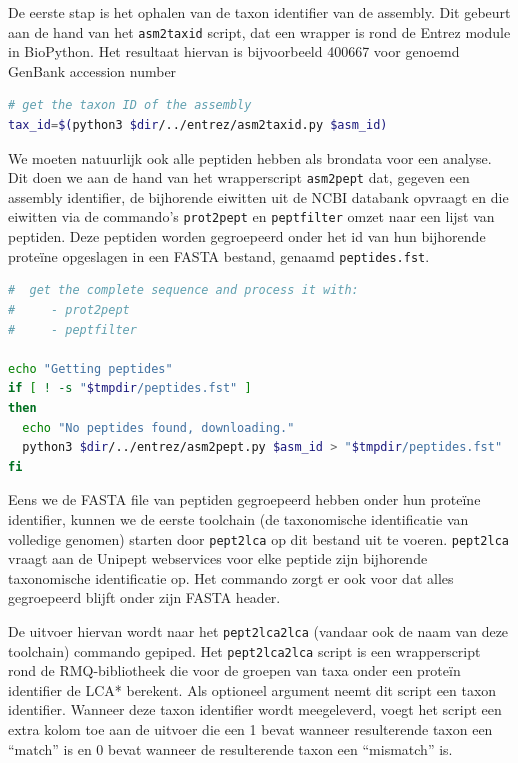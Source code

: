 De eerste stap is het ophalen van de taxon identifier van de assembly. Dit 
gebeurt aan de hand van het \texttt{asm2taxid} script, dat een wrapper is rond 
de Entrez module in BioPython. Het resultaat hiervan is bijvoorbeeld 400667 
voor genoemd GenBank accession number 

\begin{lstlisting}[language=Bash,firstnumber=34]
# get the taxon ID of the assembly
tax_id=$(python3 $dir/../entrez/asm2taxid.py $asm_id)
\end{lstlisting}

We moeten natuurlijk ook alle peptiden hebben als brondata voor een analyse. Dit
doen we aan de hand van het wrapperscript \texttt{asm2pept} dat, gegeven een
assembly identifier, de bijhorende eiwitten uit de NCBI databank opvraagt en
die eiwitten via de commando's \texttt{prot2pept} en \texttt{peptfilter} omzet
naar een lijst van peptiden. Deze peptiden worden gegroepeerd onder het id van
hun bijhorende proteïne opgeslagen in een FASTA bestand, genaamd
\texttt{peptides.fst}.

\begin{lstlisting}[language=Bash,firstnumber=36]
#  get the complete sequence and process it with:
#     - prot2pept
#     - peptfilter

echo "Getting peptides"
if [ ! -s "$tmpdir/peptides.fst" ]
then
  echo "No peptides found, downloading."
  python3 $dir/../entrez/asm2pept.py $asm_id > "$tmpdir/peptides.fst"
fi
\end{lstlisting}

Eens we de FASTA file van peptiden gegroepeerd hebben onder hun proteïne
identifier, kunnen we de eerste toolchain (de taxonomische identificatie
van volledige genomen) starten door \texttt{pept2lca} op dit bestand uit te
voeren. \texttt{pept2lca} vraagt aan de Unipept webservices voor elke peptide
zijn bijhorende taxonomische identificatie op. Het commando zorgt er ook voor
dat alles gegroepeerd blijft onder zijn FASTA header.

De uitvoer hiervan wordt naar het \texttt{pept2lca2lca} (vandaar ook de naam van
deze toolchain) commando gepiped. Het \texttt{pept2lca2lca} script is een
wrapperscript rond de RMQ-bibliotheek die voor de groepen van taxa onder een
proteïn identifier de LCA* berekent. Als optioneel argument neemt dit script een
taxon identifier. Wanneer deze taxon identifier wordt meegeleverd, voegt het
script een extra kolom toe aan de uitvoer die een 1 bevat wanneer resulterende
taxon een ``match'' is en 0 bevat wanneer de resulterende taxon een ``mismatch''
is.


